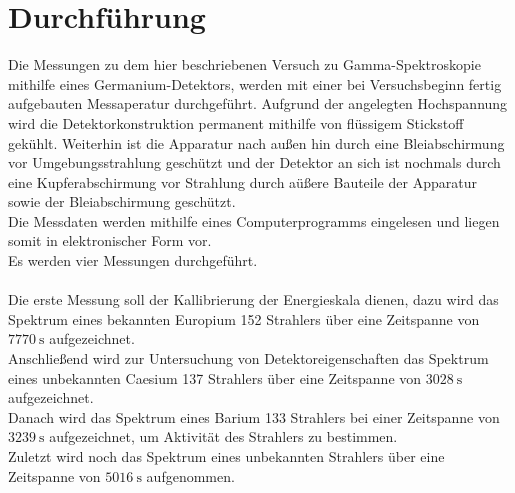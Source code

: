 \section{Durchführung}
\label{sec:Durchführung}
Die Messungen zu dem hier beschriebenen Versuch zu Gamma-Spektroskopie mithilfe eines Germanium-Detektors,
werden mit einer bei Versuchsbeginn fertig aufgebauten Messaperatur durchgeführt. Aufgrund der angelegten Hochspannung wird
die Detektorkonstruktion permanent mithilfe von flüssigem Stickstoff gekühlt. Weiterhin ist die Apparatur nach außen hin durch
eine Bleiabschirmung vor Umgebungsstrahlung geschützt und der Detektor an sich ist nochmals durch eine Kupferabschirmung
vor Strahlung durch aüßere Bauteile der Apparatur sowie der Bleiabschirmung geschützt.\\
Die Messdaten werden mithilfe eines Computerprogramms eingelesen und liegen somit in elektronischer Form vor.\\
Es werden vier Messungen durchgeführt.\\ \\
Die erste Messung soll der Kallibrierung der Energieskala dienen, dazu wird das Spektrum eines bekannten Europium 152
Strahlers über eine Zeitspanne von $\SI{7770}{\second}$ aufgezeichnet.\\
Anschließend wird zur Untersuchung von Detektoreigenschaften das Spektrum eines unbekannten Caesium 137 Strahlers
über eine Zeitspanne von $\SI{3028}{\second}$ aufgezeichnet.\\
Danach wird das Spektrum eines Barium 133 Strahlers bei einer Zeitspanne von $\SI{3239}{\second}$ aufgezeichnet, um
Aktivität des Strahlers zu bestimmen.\\
Zuletzt wird noch das Spektrum eines unbekannten Strahlers über eine Zeitspanne von $\SI{5016}{\second}$ aufgenommen.
